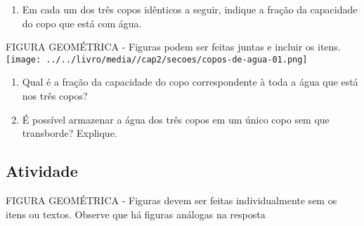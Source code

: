 \documentclass[a4,12pt]{book}
\begin{document}
\begin{enumerate} [\quad a)] %
  \item     Em cada um dos três copos idênticos a seguir, indique a fração da capacidade do copo que está com água.     \mbox{} \newline       
\end{enumerate} %
\begin{imagem*}[breakable]{}{}   FIGURA GEOMÉTRICA - Figuras podem ser feitas juntas e incluir  os itens.      \texttt{[image: ../../livro/media//cap2/secoes/copos-de-agua-01.png]}   \end{imagem*}
\begin{enumerate} [\quad a)] %
  \item     Qual é a fração da capacidade do copo correspondente à toda a água que está nos três copos?
  \item     É possível armazenar a água dos três copos em um único copo sem que transborde? Explique.
\end{enumerate} %








\subsection{Atividade}







\begin{imagem*}[breakable]{}{}   FIGURA GEOMÉTRICA - Figuras devem ser feitas individualmente sem os itens ou textos. Observe que há figuras análogas na resposta\end{imagem*} 
\end{document}
